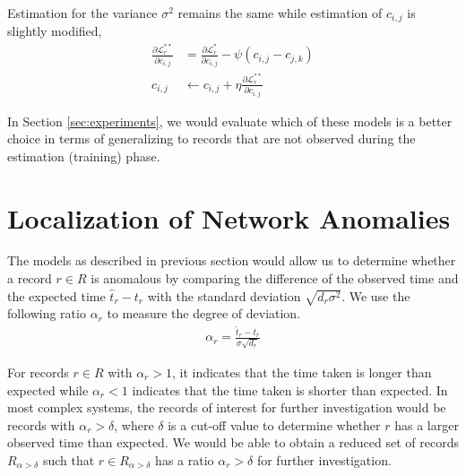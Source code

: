 \documentclass[draft]{sig-alternate}
\begin{document}
Estimation for the variance $\sigma^2$ remains the same while estimation of $c_{i,j}$ is slightly modified,
\begin{align*}
	\frac{\partial \mathcal{L}^{**}_r}{\partial c_{i,j}} &= \frac{\partial \mathcal{L}^*_r}{\partial c_{i,j}} - \psi (c_{i,j} - c_{j,k}) \\
	c_{i,j} &\leftarrow c_{i,j} + \eta \frac{\partial \mathcal{L}^{**}_r}{\partial c_{i,j}}
\end{align*}

In Section \ref{sec:experiments}, we would evaluate which of these models is a better choice in terms of generalizing to records that are not observed during the estimation (training) phase.

\section{Localization of Network Anomalies}
\label{sec:localization}

The models as described in previous section would allow us to determine whether a record $r \in R$ is anomalous by comparing the difference of the observed time and the expected time $\hat{t}_r - t_r$ with the standard deviation $\sqrt{d_r \sigma^2}$. We use the following ratio $\alpha_r$ to measure the degree of deviation.
\begin{align}
	\label{eqn:alpha_ratio}
	\alpha_r = \frac{\hat{t}_r - t_r}{\sigma \sqrt{d_r}}
\end{align}

For records $r \in R$ with $\alpha_r > 1$, it indicates that the time taken is longer than expected while $\alpha_r < 1$ indicates that the time taken is shorter than expected. In most complex systems, the records of interest for further investigation would be records with $\alpha_r > \delta$, where $\delta$ is a cut-off value to determine whether $r$ has a larger observed time than expected. We would be able to obtain a reduced set of records $R_{\alpha > \delta}$ such that $r \in R_{\alpha > \delta}$ has a ratio $\alpha_r > \delta$ for further investigation.
\end{document}
